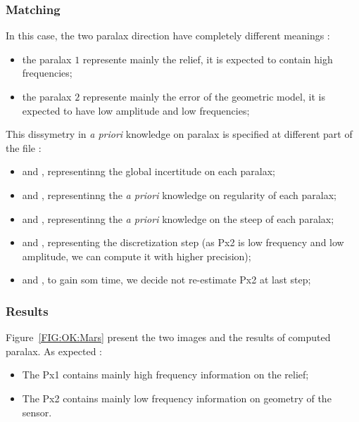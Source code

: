 \subsubsection{Matching}

In this case, the two paralax direction have completely different meanings :

\begin{itemize}
   \item the paralax $1$ represente mainly the relief, it is expected to contain high frequencies;
   \item the paralax $2$ represente mainly the error of the geometric model, it is expected to have
         low amplitude and low frequencies;
\end{itemize}

This dissymetry in \emph{a priori} knowledge on paralax is specified at different part of the file :

\begin{itemize}
   \item {\tt <Px1IncCalc>}   and {\tt <Px2IncCalc>},  representinng the global incertitude on each paralax;
   \item {\tt <Px1Regul>}   and {\tt <Px2Regul>},  representinng the \emph{a priori} knowledge on regularity of each
         paralax;
   \item {\tt <Px1PenteMax>}   and {\tt <Px2PenteMax>},  representinng the \emph{a priori} knowledge on the
         steep of each paralax;
   \item {\tt <Px1Pas>}   and {\tt <Px2Pas>},  representing the discretization step (as Px2 is low frequency and
         low amplitude, we can compute it with higher precision);
   \item {\tt <Px1DilatAlti>}   and {\tt <Px2DilatAlti>}, to gain som time, we decide not re-estimate Px2 at last step;
\end{itemize}

\subsubsection{Results}

Figure~\ref{FIG:OK:Mars} present the two images and the results of computed paralax.
As expected :

\begin{itemize}
   \item The Px1 contains mainly high frequency information on the relief;
   \item The Px2 contains mainly low frequency information on  geometry of the sensor.
\end{itemize}


